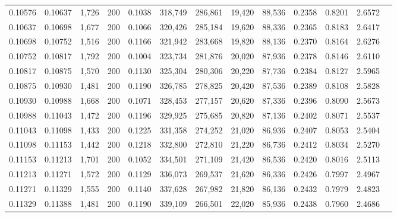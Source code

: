 \begin{tabular}{rrrrrrrrrrrrr}
0.10576 & 0.10637 &  1,726 & 200 &                                     0.1038 & 318,749 & 286,861 &  19,420 &  88,536 & 0.2358 & 0.8201 & 2.6572 \\
0.10637 & 0.10698 &  1,677 & 200 &                                     0.1066 & 320,426 & 285,184 &  19,620 &  88,336 & 0.2365 & 0.8183 & 2.6417 \\
0.10698 & 0.10752 &  1,516 & 200 &                                     0.1166 & 321,942 & 283,668 &  19,820 &  88,136 & 0.2370 & 0.8164 & 2.6276 \\
0.10752 & 0.10817 &  1,792 & 200 &                                     0.1004 & 323,734 & 281,876 &  20,020 &  87,936 & 0.2378 & 0.8146 & 2.6110 \\
0.10817 & 0.10875 &  1,570 & 200 &                                     0.1130 & 325,304 & 280,306 &  20,220 &  87,736 & 0.2384 & 0.8127 & 2.5965 \\
0.10875 & 0.10930 &  1,481 & 200 &                                     0.1190 & 326,785 & 278,825 &  20,420 &  87,536 & 0.2389 & 0.8108 & 2.5828 \\
0.10930 & 0.10988 &  1,668 & 200 &                                     0.1071 & 328,453 & 277,157 &  20,620 &  87,336 & 0.2396 & 0.8090 & 2.5673 \\
0.10988 & 0.11043 &  1,472 & 200 &                                     0.1196 & 329,925 & 275,685 &  20,820 &  87,136 & 0.2402 & 0.8071 & 2.5537 \\
0.11043 & 0.11098 &  1,433 & 200 &                                     0.1225 & 331,358 & 274,252 &  21,020 &  86,936 & 0.2407 & 0.8053 & 2.5404 \\
0.11098 & 0.11153 &  1,442 & 200 &                                     0.1218 & 332,800 & 272,810 &  21,220 &  86,736 & 0.2412 & 0.8034 & 2.5270 \\
0.11153 & 0.11213 &  1,701 & 200 &                                     0.1052 & 334,501 & 271,109 &  21,420 &  86,536 & 0.2420 & 0.8016 & 2.5113 \\
0.11213 & 0.11271 &  1,572 & 200 &                                     0.1129 & 336,073 & 269,537 &  21,620 &  86,336 & 0.2426 & 0.7997 & 2.4967 \\
0.11271 & 0.11329 &  1,555 & 200 &                                     0.1140 & 337,628 & 267,982 &  21,820 &  86,136 & 0.2432 & 0.7979 & 2.4823 \\
0.11329 & 0.11388 &  1,481 & 200 &                                     0.1190 & 339,109 & 266,501 &  22,020 &  85,936 & 0.2438 & 0.7960 & 2.4686 \\

\end{tabular}

